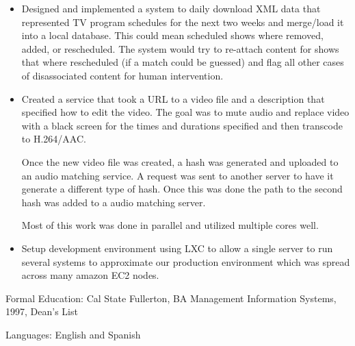 \documentclass{res}
\begin{document}
\begin{resume}
\begin{itemize}
  \item
    Designed and implemented a system to daily download XML data
    that represented TV program schedules for the next two weeks and
    merge/load it into a local database.  This could mean scheduled
    shows where removed, added, or rescheduled.  The system would try
    to re-attach content for shows that where rescheduled (if a match
    could be guessed) and flag all other cases of disassociated content
    for human intervention.

  \item
    Created a service that took a URL to a video file and a description
    that specified how to edit the video.  The goal was to mute audio
    and replace video with a black screen for the times and durations
    specified and then transcode to H.264/AAC.

    Once the new video file was created, a hash was generated and uploaded
    to an audio matching service. A request was sent to another server
    to have it generate a different type of hash.  Once this was done
    the path to the second hash was added to a audio matching server.

    Most of this work was done in parallel and utilized multiple cores
    well.

  \item
    Setup development environment using LXC to allow a single server to
    run several systems to approximate our production environment which
    was spread across many amazon EC2 nodes.

  \end{itemize}

Formal Education: Cal State Fullerton, BA Management Information
Systems, 1997, Dean's List

Languages: English and Spanish

\end{resume}
\end{document}
